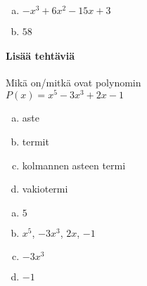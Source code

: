 \begin{tehtavasivu}
\begin{tehtava}
	\begin{vastaus}
		\begin{enumerate}[a)]
			\item $-x^3+6x^2-15x+3$
			\item $58$
	\end{enumerate}
	\end{vastaus}
\end{tehtava}

\newpage
\paragraph*{Lisää tehtäviä}

\begin{tehtava}
	Mikä on/mitkä ovat polynomin \\ $P(x) = x^5-3x^3+2x-1$
	\begin{enumerate}[a)]
		\item aste
		\item termit
		\item kolmannen asteen termi
		\item vakiotermi
	\end{enumerate}

	\begin{vastaus}
		\begin{enumerate}[a)]
			\item $5$
			\item $x^5$, $-3x^3$, $2x$, $-1$
			\item $-3x^3$
			\item $-1$
		\end{enumerate}
	\end{vastaus}
\end{tehtava}


\end{tehtavasivu}
